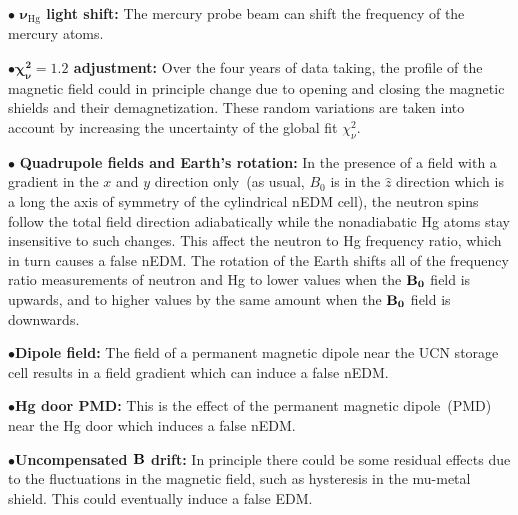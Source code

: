 \begin{description}
\item{ $\bullet$ \bf{$\boldsymbol{\nu_{\mathrm{Hg}}}$ light shift:}}
  The mercury probe beam can shift the frequency of the
  mercury atoms.
  
\item{$\bullet$\bf{$\boldsymbol{\chi_{\nu}^2 = 1.2}$ adjustment:}}
  Over the four years of data taking, the profile of the magnetic
  field could in principle change due to opening and closing the
  magnetic shields and their demagnetization. These random variations
  are taken into account by increasing the uncertainty of the global
  fit $\chi^2_{\nu}$.
  
\item{$\bullet$ \bf{Quadrupole fields and Earth's
      rotation:}\cite{ucnbook}} In the presence of a field with a
  gradient in the $x$ and $y$ direction only~(as usual, $B_0$ is in
  the $\hat{z}$ direction which is a long the axis of symmetry of the
  cylindrical nEDM cell), the neutron spins follow the total field
  direction adiabatically while the nonadiabatic Hg atoms stay
  insensitive to such changes. This affect the neutron to Hg frequency
  ratio, which in turn causes a false nEDM. The rotation of the Earth
  shifts all of the frequency ratio measurements of neutron and Hg to
  lower values when the $\bf{B_0}$ field is upwards, and to higher
  values by the same amount when the $\bf{B_0}$ field is downwards.
  
\item{$\bullet$\bf{Dipole field:}} The field of a permanent magnetic
  dipole near the UCN storage cell results in a field gradient which can
  induce a false nEDM.

\item{$\bullet$\bf{Hg door PMD:}} This is the effect of the permanent
  magnetic dipole~(PMD) near the Hg door which induces a false nEDM.
  

\item{$\bullet$\bf{Uncompensated
      $\bf{B}$ drift:}} In principle there could be some residual
  effects due to the fluctuations in the magnetic field, such as
  hysteresis in the mu-metal shield. This could eventually induce a
  false EDM.


\end{description}
